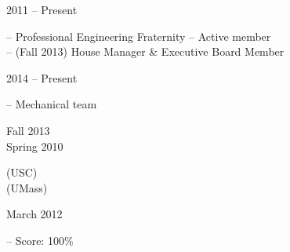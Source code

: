 

\flushleft \begin{minipage}[t]{\dateColWidth}
2011 -- Present
\end{minipage}
\begin{minipage}[t]{10 em}
\end{minipage}
\begin{minipage}[t]{0.6\textwidth} 
-- Professional Engineering Fraternity -- Active member \\
-- (Fall 2013) House Manager \& Executive Board Member
\end{minipage}

\flushleft \begin{minipage}[t]{\dateColWidth}
2014 -- Present
\end{minipage}
\begin{minipage}[t]{0.8\textwidth}
 -- Mechanical team
\end{minipage}

\flushleft \begin{minipage}[t]{\dateColWidth}
Fall 2013 \\
Spring 2010
\end{minipage}
\begin{minipage}[t]{0.8\textwidth}
 (USC) \\
 (UMass)
\end{minipage}

\flushleft \begin{minipage}[t]{\dateColWidth}
March 2012
\end{minipage}
\begin{minipage}[t]{0.8\textwidth}
 -- Score: 100\%
\end{minipage}